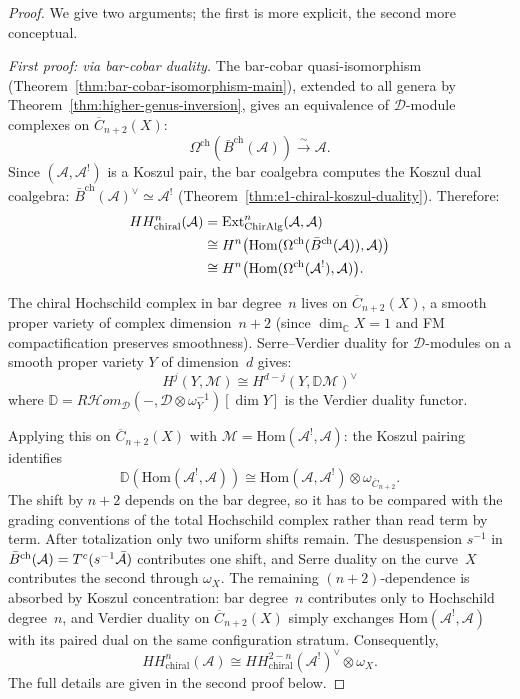 \begin{proof}
We give two arguments; the first is more explicit, the second more conceptual.

\medskip\noindent\emph{First proof: via bar-cobar duality.}
The bar-cobar quasi-isomorphism (Theorem~\ref{thm:bar-cobar-isomorphism-main}),
extended to all genera by Theorem~\ref{thm:higher-genus-inversion}, gives an
equivalence of $\mathcal{D}$-module complexes on $\overline{C}_{n+2}(X)$:
\[
\Omega^{\mathrm{ch}}(\bar{B}^{\mathrm{ch}}(\mathcal{A}))
\xrightarrow{\;\sim\;} \mathcal{A}.
\]
Since $(\mathcal{A}, \mathcal{A}^!)$ is a Koszul pair, the bar coalgebra
computes the Koszul dual coalgebra:
$\bar{B}^{\mathrm{ch}}(\mathcal{A})^{\vee} \simeq \mathcal{A}^!$
(Theorem~\ref{thm:e1-chiral-koszul-duality}).  Therefore:
\begin{align}
HH^n_{\mathrm{chiral}}(\mathcal{A})
&= \mathrm{Ext}^n_{\mathrm{ChirAlg}}(\mathcal{A}, \mathcal{A}) \notag \\
&\cong H^n\bigl(\mathrm{Hom}(\Omega^{\mathrm{ch}}(\bar{B}^{\mathrm{ch}}(\mathcal{A})), \mathcal{A})\bigr) \notag \\
&\cong H^n\bigl(\mathrm{Hom}(\Omega^{\mathrm{ch}}(\mathcal{A}^!), \mathcal{A})\bigr). \label{eq:hh-via-hom}
\end{align}

The chiral Hochschild complex in bar degree~$n$ lives on
$\overline{C}_{n+2}(X)$, a smooth proper variety of complex dimension~$n+2$
(since $\dim_{\mathbb{C}} X = 1$ and FM compactification preserves smoothness).
Serre--Verdier duality for $\mathcal{D}$-modules on a smooth proper variety
$Y$ of dimension~$d$ gives:
\[
H^j(Y, \mathcal{M}) \cong H^{d-j}(Y, \mathbb{D}\mathcal{M})^{\vee}
\]
where $\mathbb{D} = R\mathcal{H}\!\mathit{om}_{\mathcal{D}}({-}, \mathcal{D} \otimes \omega_Y^{-1})[\dim Y]$
is the Verdier duality functor.

Applying this on $\overline{C}_{n+2}(X)$ with
$\mathcal{M} = \mathrm{Hom}(\mathcal{A}^!, \mathcal{A})$:
the Koszul pairing identifies
\[
\mathbb{D}(\mathrm{Hom}(\mathcal{A}^!, \mathcal{A}))
\cong \mathrm{Hom}(\mathcal{A}, \mathcal{A}^!)
\otimes \omega_{\overline{C}_{n+2}}.
\]
The shift by $n+2$ depends on the bar degree, so it has to be compared
with the grading conventions of the total Hochschild complex rather
than read term by term.  After totalization only two uniform shifts
remain.  The desuspension $s^{-1}$ in
$\bar{B}^{\mathrm{ch}}(\mathcal{A}) = T^c(s^{-1}\bar{\mathcal{A}})$ contributes one
shift, and Serre duality on the curve~$X$ contributes the second
through $\omega_X$.  The remaining $(n+2)$-dependence is absorbed by
Koszul concentration: bar degree~$n$ contributes only to Hochschild
degree~$n$, and Verdier duality on $\overline{C}_{n+2}(X)$ simply
exchanges $\mathrm{Hom}(\mathcal{A}^!, \mathcal{A})$ with its paired
dual on the same configuration stratum.  Consequently,
\[
HH^n_{\mathrm{chiral}}(\mathcal{A})
\cong HH^{2-n}_{\mathrm{chiral}}(\mathcal{A}^!)^{\vee} \otimes \omega_X.
\]
The full details are given in the second proof below.


\end{proof}
